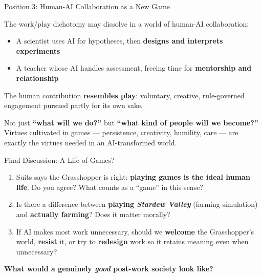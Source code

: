 \documentclass[aspectratio=169,11pt]{beamer}
\begin{document}
\begin{frame}[t]{Position 3: Human-AI Collaboration as a New Game}
\vspace{-0.2cm}
\begin{probox}
\footnotesize
The work/play dichotomy may dissolve in a world of human-AI collaboration:
\begin{itemize}
    \item A scientist uses AI for hypotheses, then \textbf{designs and interprets experiments}
    \item A teacher whose AI handles assessment, freeing time for \textbf{mentorship and relationship}
\end{itemize}
The human contribution \textbf{resembles play}: voluntary, creative, rule-governed engagement pursued partly for its own sake.
\end{probox}

\vspace{0.05cm}
\begin{conceptbox}
\footnotesize
Not just \textbf{``what will we do?''} but \textbf{``what kind of people will we become?''} Virtues cultivated in games --- persistence, creativity, humility, care --- are exactly the virtues needed in an AI-transformed world.
\end{conceptbox}
\end{frame}

\begin{frame}{Final Discussion: A Life of Games?}
\begin{discussionbox}[Discussion]
\footnotesize
\begin{enumerate}
    \item Suits says the Grasshopper is right: \textbf{playing games is the ideal human life}. Do you agree? What counts as a ``game'' in this sense?
    \item Is there a difference between \textbf{playing \emph{Stardew Valley}} (farming simulation) and \textbf{actually farming}? Does it matter morally?
    \item If AI makes most work unnecessary, should we \textbf{welcome} the Grasshopper's world, \textbf{resist} it, or try to \textbf{redesign} work so it retains meaning even when unnecessary?
\end{enumerate}
\textbf{What would a genuinely \emph{good} post-work society look like?}
\end{discussionbox}
\end{frame}
\end{document}
